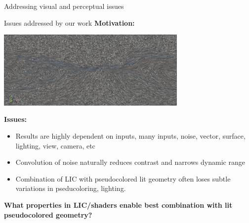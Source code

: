 \documentclass[notes]{beamer}
\begin{document}
\begin{frame}{Addressing visual and perceptual issues}
        \begin{beamerboxesrounded}{Issues addressed by our work}
        {\bf \footnotesize Motivation:}
        \begin{center}
        \includegraphics[width=3.65in]{motivations-vpic.png}
        \end{center}
        \vspace{-0.1in}
        {\bf Issues:}
        \begin{itemize}
        \scriptsize
        \item Results are highly dependent on inputs, many inputs, noise, vector, surface, lighting, view, camera, etc
        \item Convolution of noise naturally reduces contrast and narrows dynamic range
        \item Combination of LIC with pseudocolored lit geometry often loses subtle variations in pseducoloring, lighting.
        \end{itemize}
        {\bf  \footnotesize  What properties in LIC/shaders enable best combination with lit pseudocolored geometry?}
      \end{beamerboxesrounded}
\end{frame}
\end{document}

